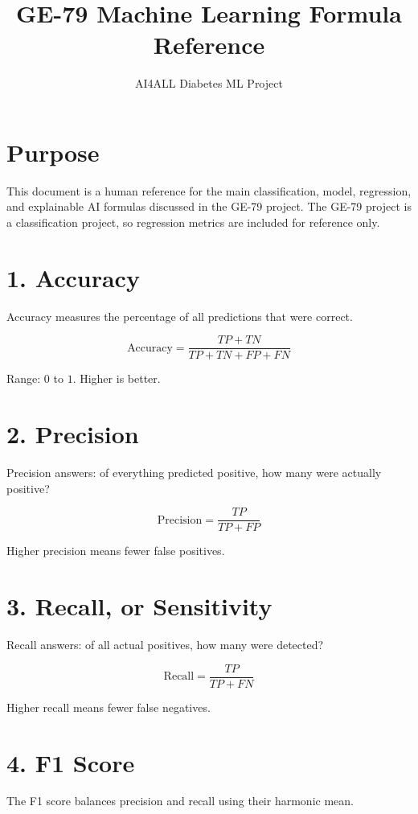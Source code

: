 \documentclass[11pt]{article}
\title{GE-79 Machine Learning Formula Reference}
\author{AI4ALL Diabetes ML Project}
\date{}
\begin{document}
\maketitle

\section*{Purpose}

This document is a human reference for the main classification, model, regression,
and explainable AI formulas discussed in the GE-79 project. The GE-79 project is a
classification project, so regression metrics are included for reference only.

\section*{1. Accuracy}

Accuracy measures the percentage of all predictions that were correct.

\[
\text{Accuracy} =
\frac{TP + TN}{TP + TN + FP + FN}
\]

\noindent Range: \(0\) to \(1\). Higher is better.

\section*{2. Precision}

Precision answers: of everything predicted positive, how many were actually positive?

\[
\text{Precision} =
\frac{TP}{TP + FP}
\]

\noindent Higher precision means fewer false positives.

\section*{3. Recall, or Sensitivity}

Recall answers: of all actual positives, how many were detected?

\[
\text{Recall} =
\frac{TP}{TP + FN}
\]

\noindent Higher recall means fewer false negatives.

\section*{4. F1 Score}

The F1 score balances precision and recall using their harmonic mean.
\end{document}
